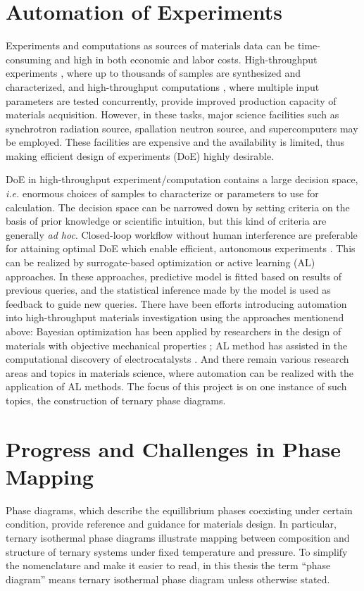 \section{Automation of Experiments}
Experiments and computations as sources of materials data can be time-consuming and high in both economic and labor costs. High-throughput experiments \parencite{CombiCuZn}, where up to thousands of samples are synthesized and characterized, and high-throughput computations \parencite{LiBatCalc}, where multiple input parameters are tested concurrently, provide improved production capacity of materials acquisition. However, in these tasks, major science facilities such as synchrotron radiation source, spallation neutron source, and supercomputers may be employed. These facilities are expensive and the availability is limited, thus making efficient design of experiments (DoE) highly desirable.

DoE in high-throughput experiment/computation contains a large decision space, \emph{i.e.} enormous choices of samples to characterize or parameters to use for calculation. The decision space can be narrowed down by setting criteria on the basis of prior knowledge or scientific intuition, but this kind of criteria are generally \emph{ad hoc}. Closed-loop workflow without human interference are preferable for attaining optimal DoE which enable efficient, autonomous experiments \parencite{AutoReview}. This can be realized by surrogate-based optimization or active learning (AL) approaches. In these approaches, predictive model is fitted based on results of previous queries, and the statistical inference made by the model is used as feedback to guide new queries. There have been efforts introducing automation into high-throughput materials investigation using the approaches mentionend above: Bayesian optimization has been applied by researchers in the design of materials with objective mechanical properties \parencite{bayesianAuto}; AL method has assisted in the computational discovery of electrocatalysts \parencite{ALCat}. And there remain various research areas and topics in materials science, where automation can be realized with the application of AL methods. The focus of this project is on one instance of such topics, the construction of ternary phase diagrams.

\section{Progress and Challenges in Phase Mapping}  %
Phase diagrams, which describe the equillibrium phases coexisting under certain condition, provide reference and guidance for materials design. In particular, ternary isothermal phase diagrams illustrate mapping between composition and structure of ternary systems under fixed temperature and pressure. To simplify the nomenclature and make it easier to read, in this thesis the term ``phase diagram'' means ternary isothermal phase diagram unless otherwise stated.

